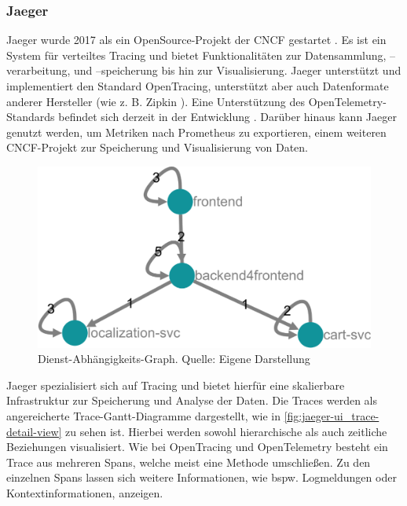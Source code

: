 \subsubsection{Jaeger}
\label{subsec:jaeger}

Jaeger wurde 2017 als ein OpenSource-Projekt der CNCF gestartet \cite{Jaeger}. Es ist ein System für verteiltes Tracing und bietet Funktionalitäten zur Datensammlung, --verarbeitung, und --speicherung bis hin zur Visualisierung. Jaeger unterstützt und implementiert den Standard OpenTracing, unterstützt aber auch Datenformate anderer Hersteller (wie z. B. Zipkin \cite{Zipkin}). Eine Unterstützung des OpenTelemetry-Standards befindet sich derzeit in der Entwicklung \cite{JaegerOpenTelemetry}. Darüber hinaus kann Jaeger genutzt werden, um Metriken nach Prometheus \cite{Prometheus} zu exportieren, einem weiteren CNCF-Projekt zur Speicherung und Visualisierung von Daten.

\begin{figure}
\centering
\includegraphics[width=\linewidth]{img/03_methoden/jaeger_dependency-graph.png}
\caption{Dienst-Abhängigkeits-Graph. Quelle: Eigene Darstellung}
\label{fig:jaeger-ui_dependency-graph}
\end{figure}

Jaeger spezialisiert sich auf Tracing und bietet hierfür eine skalierbare Infrastruktur zur Speicherung und Analyse der Daten. Die Traces werden als angereicherte Trace-Gantt-Diagramme dargestellt, wie in \autoref{fig:jaeger-ui_trace-detail-view} zu sehen ist. Hierbei werden sowohl hierarchische als auch zeitliche Beziehungen visualisiert. Wie bei OpenTracing und OpenTelemetry besteht ein Trace aus mehreren Spans, welche meist eine Methode umschließen. Zu den einzelnen Spans lassen sich weitere Informationen, wie bspw. Logmeldungen oder Kontextinformationen, anzeigen.

